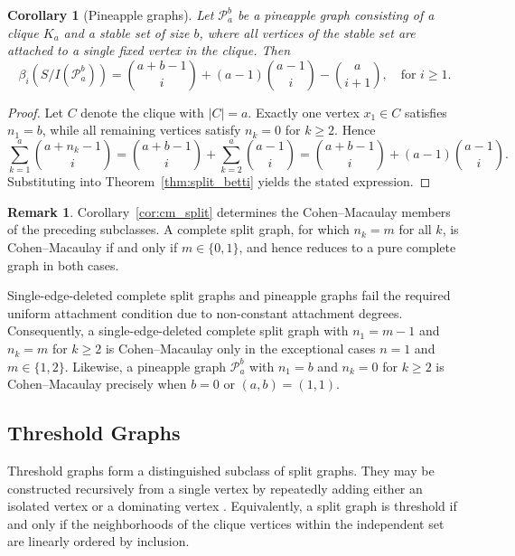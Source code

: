 \documentclass[12pt, reqno]{amsart}
\newtheorem{corollary}[theorem]{Corollary}
\theoremstyle{definition}
\newtheorem{remark}[theorem]{Remark}
\numberwithin{equation}{section}
\begin{document}
	\begin{corollary}[Pineapple graphs]
		Let $\mathcal{P}_a^b$ be a pineapple graph consisting of a clique $K_a$ and a stable set of size $b$, where all vertices of the stable set are attached to a single fixed vertex in the clique. Then
		\[
		\beta_i(S/I(\mathcal{P}_a^b)) = \binom{a+b-1}{i} + (a-1)\binom{a-1}{i} - \binom{a}{i+1}, \quad \text{for } i \ge1.
		\]
	\end{corollary}
	
	\begin{proof}
		Let $C$ denote the clique with $|C|=a$. Exactly one vertex $x_1 \in C$ satisfies $n_1=b$, while all remaining vertices satisfy $n_k=0$ for $k\ge 2$. Hence
		\[
		\sum_{k=1}^a \binom{a+n_k-1}{i}
		= \binom{a+b-1}{i} + \sum_{k=2}^a \binom{a-1}{i}
		= \binom{a+b-1}{i} + (a-1)\binom{a-1}{i}.
		\]
		Substituting into Theorem~\ref{thm:split_betti} yields the stated expression.
	\end{proof}
	
	\begin{remark}
		Corollary~\ref{cor:cm_split} determines the Cohen--Macaulay members of the preceding subclasses. A complete split graph, for which $n_k=m$ for all $k$, is Cohen--Macaulay if and only if $m\in\{0,1\}$, and hence reduces to a pure complete graph in both cases.
		
		Single-edge-deleted complete split graphs and pineapple graphs fail the required uniform attachment condition due to non-constant attachment degrees. Consequently, a single-edge-deleted complete split graph with $n_1=m-1$ and $n_k=m$ for $k\ge2$ is Cohen--Macaulay only in the exceptional cases $n=1$ and $m\in\{1,2\}$. Likewise, a pineapple graph $\mathcal P_a^b$ with $n_1=b$ and $n_k=0$ for $k\ge2$ is Cohen--Macaulay precisely when $b=0$ or $(a,b)=(1,1)$.
	\end{remark}
	
	\subsection{Threshold Graphs}
	
	Threshold graphs form a distinguished subclass of split graphs. They may be constructed recursively from a single vertex by repeatedly adding either an isolated vertex or a dominating vertex \cite{nagel2009}. Equivalently, a split graph is threshold if and only if the neighborhoods of the clique vertices within the independent set are linearly ordered by inclusion.
	
\end{document}
